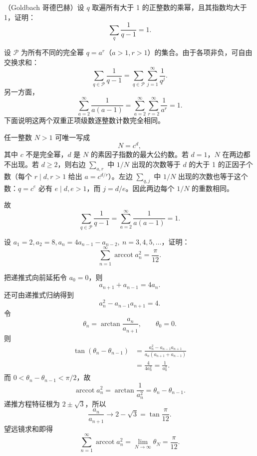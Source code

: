 \begin{xreferenceproblem}[4]
（Goldbach 哥德巴赫）设 $q$ 取遍所有大于 1 的正整数的乘幂，且其指数均大于 1，证明：
\[
  \sum_q\frac1{q-1}=1.
\]
\end{xreferenceproblem}
\begin{xsolution}
设 $\mathcal P$ 为所有不同的完全幂 $q=a^r$（$a>1,r>1$）的集合。由于各项非负，可自由交换求和：
\[
  \sum_{q\in\mathcal P}\frac1{q-1}
  =\sum_{q\in\mathcal P}\sum_{j=1}^{\infty}\frac1{q^j}.
\]
另一方面，
\[
  \sum_{a=2}^{\infty}\frac1{a(a-1)}
  =\sum_{a=2}^{\infty}\sum_{r=2}^{\infty}\frac1{a^r}=1.
\]
下面说明这两个双重正项级数逐整数计数完全相同。

任一整数 $N>1$ 可唯一写成
\[
  N=c^d,
\]
其中 $c$ 不是完全幂，$d$ 是 $N$ 的素因子指数的最大公约数。若 $d=1$，$N$ 在两边都不出现。若 $d\geqslant2$，则右边 $\sum_{a,r}$ 中 $1/N$ 出现的次数等于 $d$ 的大于 1 的正因子个数（每个 $r\mid d,r>1$ 给出 $a=c^{d/r}$）。左边 $\sum_{q,j}$ 中 $1/N$ 出现的次数也等于这个数：$q=c^e$ 必有 $e\mid d,e>1$，而 $j=d/e$。因此两边每个 $1/N$ 的重数相同。

故
\[
  \sum_{q\in\mathcal P}\frac1{q-1}
  =\sum_{a=2}^{\infty}\frac1{a(a-1)}=1.
\]
\end{xsolution}


\begin{xreferenceproblem}[5]
设 $a_1=2,a_2=8,a_n=4a_{n-1}-a_{n-2},\ n=3,4,5,\ldots$，证明：
\[
  \sum_{n=1}^{\infty}\operatorname{arccot}a_n^2=\frac\pi{12}.
\]
\end{xreferenceproblem}
\begin{xsolution}
把递推式向前延拓令 $a_0=0$，则
\[
  a_{n+1}+a_{n-1}=4a_n.
\]
还可由递推式归纳得到
\[
  a_n^2-a_{n-1}a_{n+1}=4.
\]
令
\[
  \theta_n=\arctan\frac{a_n}{a_{n+1}},\qquad \theta_0=0.
\]
则
\[
\begin{aligned}
  \tan(\theta_n-\theta_{n-1})
  &=\frac{a_n^2-a_{n-1}a_{n+1}}
  {a_n(a_{n+1}+a_{n-1})}\\
  &=\frac4{4a_n^2}=\frac1{a_n^2}.
\end{aligned}
\]
而 $0<\theta_n-\theta_{n-1}<\pi/2$，故
\[
  \operatorname{arccot}a_n^2
  =\arctan\frac1{a_n^2}=\theta_n-\theta_{n-1}.
\]
递推方程特征根为 $2\pm\sqrt3$，所以
\[
  \frac{a_n}{a_{n+1}}\to2-\sqrt3=\tan\frac\pi{12}.
\]
望远镜求和即得
\[
  \sum_{n=1}^{\infty}\operatorname{arccot}a_n^2
  =\lim_{N\to\infty}\theta_N=\frac\pi{12}.
\]
\end{xsolution}


